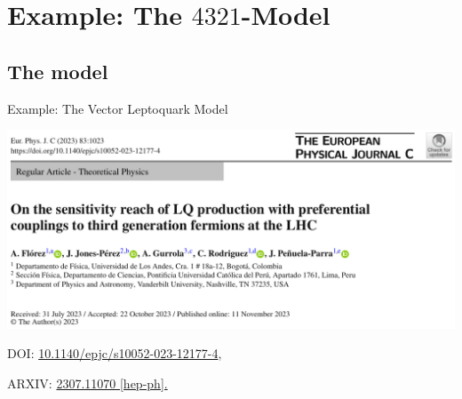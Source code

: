 \documentclass{../bredelebeamer}
\begin{document}
\section{Example: The $4321$-Model}
\subsection{The model}

\begin{frame}{Example: The Vector Leptoquark Model}
		\begin{center}
			\includegraphics[width=1.03\linewidth]{on_vLQ.png}
		\end{center}	

		\vfill 
		DOI: \href{https://doi.org/10.1140/epjc/s10052-023-12177-4}{10.1140/epjc/s10052-023-12177-4}, 
		
		ARXIV: \href{https://arxiv.org/abs/2307.11070}{2307.11070 [hep-ph].}
\end{frame}

\end{document}
